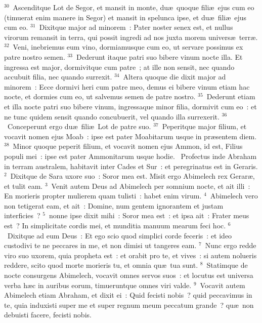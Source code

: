 ${}^{30}$~Ascenditque Lot de Segor, et mansit in monte, du\ae\ quoque fili\ae\ ejus cum eo (timuerat enim manere in Segor) et mansit in spelunca ipse, et du\ae\ fili\ae\ ejus cum eo.
${}^{31}$~Dixitque major ad minorem~: Pater noster senex est, et nullus virorum remansit in terra, qui possit ingredi ad nos juxta morem univers\ae\ terr\ae .
${}^{32}$~Veni, inebriemus eum vino, dormiamusque cum eo, ut servare possimus ex patre nostro semen.
${}^{33}$~Dederunt itaque patri suo bibere vinum nocte illa. Et ingressa est major, dormivitque cum patre~; at ille non sensit, nec quando accubuit filia, nec quando surrexit.
${}^{34}$~Altera quoque die dixit major ad minorem~: Ecce dormivi heri cum patre meo, demus ei bibere vinum etiam hac nocte, et dormies cum eo, ut salvemus semen de patre nostro.
${}^{35}$~Dederunt etiam et illa nocte patri suo bibere vinum, ingressaque minor filia, dormivit cum eo~: et ne tunc quidem sensit quando concubuerit, vel quando illa surrexerit.
${}^{36}$~Conceperunt ergo du\ae\ fili\ae\ Lot de patre suo.
${}^{37}$~Peperitque major filium, et vocavit nomen ejus Moab~: ipse est pater Moabitarum usque in pr\ae sentem diem.
${}^{38}$~Minor quoque peperit filium, et vocavit nomen ejus Ammon, id est, Filius populi mei~: ipse est pater Ammonitarum usque hodie.
~Profectus inde Abraham in terram australem, habitavit inter Cades et Sur~: et peregrinatus est in Geraris.
${}^{2}$~Dixitque de Sara uxore suo~: Soror mea est. Misit ergo Abimelech rex Gerar\ae , et tulit eam.
${}^{3}$~Venit autem Deus ad Abimelech per somnium nocte, et ait illi~: En morieris propter mulierem quam tulisti~: habet enim virum.
${}^{4}$~Abimelech vero non tetigerat eam, et ait~: Domine, num gentem ignorantem et justam interficies~?
${}^{5}$~nonne ipse dixit mihi~: Soror mea est~: et ipsa ait~: Frater meus est~? In simplicitate cordis mei, et munditia manuum mearum feci hoc.
${}^{6}$~Dixitque ad eum Deus~: Et ego scio quod simplici corde feceris~: et ideo custodivi te ne peccares in me, et non dimisi ut tangeres eam.
${}^{7}$~Nunc ergo redde viro suo uxorem, quia propheta est~: et orabit pro te, et vives~: si autem nolueris reddere, scito quod morte morieris tu, et omnia qu\ae\ tua sunt.
${}^{8}$~Statimque de nocte consurgens Abimelech, vocavit omnes servos suos~: et locutus est universa verba h\ae c in auribus eorum, timueruntque omnes viri valde.
${}^{9}$~Vocavit autem Abimelech etiam Abraham, et dixit ei~: Quid fecisti nobis~? quid peccavimus in te, quia induxisti super me et super regnum meum peccatum grande~? qu\ae\ non debuisti facere, fecisti nobis.
